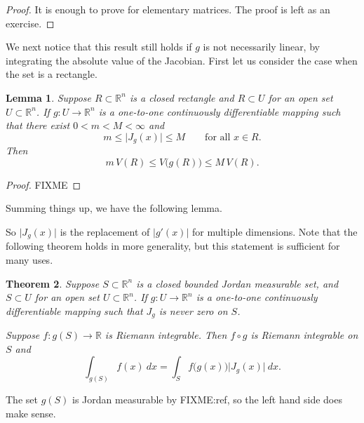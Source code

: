 \documentclass[12pt]{book}
\newcommand{\sabs}[1]{\lvert {#1} \rvert}
\newcommand{\R}{{\mathbb{R}}}
\theoremstyle{plain}
\newtheorem{thm}{Theorem}[section]
\newtheorem{lemma}[thm]{Lemma}
\theoremstyle{remark}
\theoremstyle{definition}
\theoremstyle{exercise}
\theoremstyle{example}
\begin{document}
\begin{proof}
It is enough to prove for elementary matrices.  The proof is left as an
exercise.
\end{proof}

We next notice that this result still holds if $g$ is not necessarily
linear, by integrating the absolute value of the Jacobian.
First let us consider the case when the set is a rectangle.

\begin{lemma}
Suppose $R \subset \R^n$ is a closed rectangle
and $R \subset U$ for an open set $U \subset \R^n$.  If
$g \colon U \to \R^n$ is a one-to-one
continuously differentiable mapping such that
there exist $0 < m < M < \infty$ and
\begin{equation*}
m \leq \sabs{J_g(x)} \leq M
\qquad \text{for all $x \in R$.}
\end{equation*}
Then
\begin{equation*}
m \, V(R) \leq V\bigl(g(R)\bigr) \leq M \, V(R) .
\end{equation*}
\end{lemma}

\begin{proof}
FIXME
\end{proof}

Summing things up, we have
the following lemma.

So $\sabs{J_g(x)}$ is the replacement of $\sabs{g'(x)}$ for multiple
dimensions.  Note that the following theorem holds in more generality,
but this statement is sufficient for many uses.

\begin{thm}
Suppose $S \subset \R^n$ is a closed bounded Jordan measurable set,
and $S \subset U$ for an open set $U \subset \R^n$.  If
$g \colon U \to \R^n$ is a one-to-one
continuously differentiable mapping such that
$J_g$ is never zero on $S$.

Suppose $f \colon g(S) \to \R$ is Riemann
integrable.  Then $f \circ g$ is Riemann integrable on $S$ and
\begin{equation*}
\int_{g(S)} f(x) ~ dx = 
\int_S f\bigl(g(x)\bigr) \sabs{J_g(x)} ~ dx .
\end{equation*}
\end{thm}

The set $g(S)$ is Jordan measurable by FIXME:ref, so the left hand side does
make sense.
\end{document}
